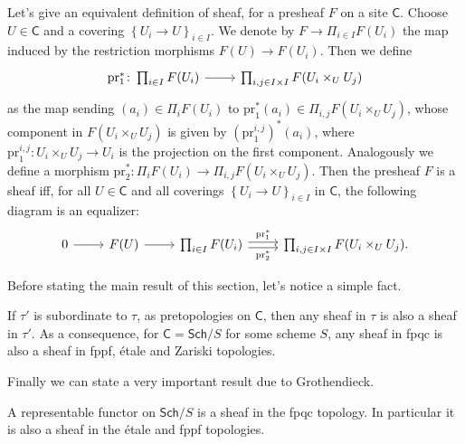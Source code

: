\begin{rem}[]\label{CharacterizationSheaves}
	Let's give an equivalent definition of sheaf, for a presheaf
	$F$ on a site $\mathsf{C}$.
	Choose $U \in \mathsf{C}$ and a covering $\left\{ U_{ i } \to U \right\}_{ i \in I }$.
	We denote by $F \to \Pi_{i \in I} F(U_i)$ the map induced by the
	restriction morphisms $F(U) \to F(U_i)$.
	Then we define
	\begin{equation*}
	\begin{tikzcd}[row sep = 0ex
		,/tikz/column 1/.append style={anchor=base east}
		,/tikz/column 2/.append style={anchor=base west}]
		\mathrm{pr}_1^*\colon \prod_{i \in I} F(U_i) \arrow[r, "", rightarrow] &
		\prod_{i,j \in I \times I} F( U_i \times_{ U } U_j )
	\end{tikzcd}
	\end{equation*} 
	as the map sending $(a_i) \in \Pi_i F(U_i)$ to
	$\mathrm{pr}_1^*(a_i) \in \Pi_{i,j} F( U_i \times_{ U } U_j )$,
	whose component in $F( U_i \times_{ U } U_j )$ is given by $(\mathrm{pr}_1^{i,j})^*(a_i)$,
	where $\mathrm{pr}^{i,j}_1\colon U_i \times_{ U } U_j \to U_i$ is the projection on the first
	component.
	Analogously we define a morphism $\mathrm{pr}_2^*\colon \Pi_i F(U_i) \to 
	\Pi_{i,j} F( U_i \times_{ U } U_j )$.
	Then the presheaf $F$ is a sheaf iff, for all $U \in \mathsf{C}$ and all coverings
	$\left\{ U_{ i } \to U \right\}_{ i \in I }$ in $\mathsf{C}$,
	the following diagram is an equalizer:
	\begin{equation*}
	\begin{tikzcd}
		0 \arrow[r, "", rightarrow] &
		F(U) \arrow[r, "", rightarrow] &
		\prod_{i \in I} F(U_i) 
		\arrow[r, "\mathrm{pr}_1^*", rightarrow, shift left = 0.5ex] 
		\arrow[r, "\mathrm{pr}_2^*"', rightarrow, shift right = 0.5ex] &
		\prod_{i,j \in I \times I} F( U_i \times_{ U } U_j )
	.\end{tikzcd}
	\end{equation*}
\end{rem}


\noindent
Before stating the main result of this section, let's notice
a simple fact.
\begin{rem}[]
	If $\tau'$ is subordinate to $\tau$, as pretopologies on $\mathsf{C}$,
	then any sheaf in $\tau$ is also a sheaf in $\tau'$.
	As a consequence, for $\mathsf{C} = \mathsf{Sch}/S$ for some scheme $S$,
	any sheaf in fpqc is also a sheaf in fppf, étale and Zariski topologies.
\end{rem}


\noindent
Finally we can state a very important result due to Grothendieck.
\begin{thm}\label{thm:reprFctSheaf}
	A representable functor on $\mathsf{Sch}/S$ is a sheaf in the fpqc topology.
	In particular it is also a sheaf in the étale and fppf topologies.
\end{thm}



